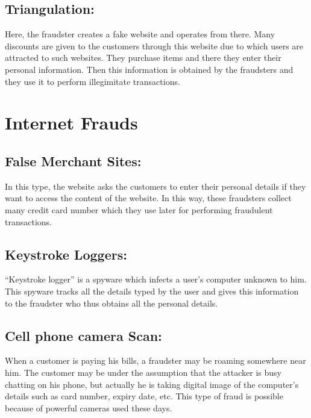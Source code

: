 \documentclass{report}
\begin{document}
\subsection{Triangulation:}
Here, the fraudster creates a fake website and operates from there. Many discounts are given to the customers through this website due to which users are attracted to such websites. They purchase items and there they enter their personal information. Then this information is obtained by the fraudsters and they use it to perform illegimitate transactions.  

\paragraph{}
\section{Internet Frauds}
\paragraph{}
\subsection{False Merchant Sites:}
 In this type, the website asks the customers to enter their personal details if they want to access the content of the website. In this way, these fraudsters collect many credit card number which they use later for performing fraudulent transactions.

\subsection{Keystroke Loggers:}
“Keystroke logger” is a spyware which infects a user’s computer unknown to him. This spyware tracks all the details typed by the user and gives this information to the fraudster who thus obtains all the personal details.

\subsection{Cell phone camera Scan:}
When a customer is paying his bills, a fraudster may be roaming somewhere near him. The customer may be under the assumption that the attacker is busy chatting on his phone, but actually he is taking digital image of the computer’s details such as card number, expiry date, etc. This type of fraud is possible because of powerful cameras used these days. 
\end{document}
